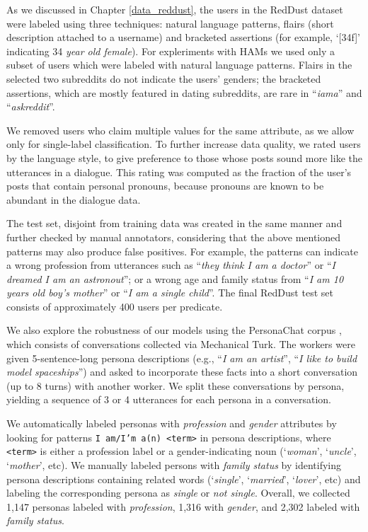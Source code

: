 As we discussed in Chapter \ref{data_reddust}, the users in the RedDust dataset were labeled using three techniques: natural language patterns, flairs (short description attached to a username) and bracketed assertions (for example, `[34f]' indicating 34 \textit{year old female}). For expleriments with HAMs we used only a subset of users which were labeled with natural language patterns. Flairs in the selected two subreddits do not indicate the users' genders; the bracketed assertions, which are mostly featured in dating subreddits, are rare in ``\textit{iama}'' and ``\textit{askreddit}''.

We removed users who claim multiple values for the
same attribute, as we allow only for single-label classification. 
To further increase data quality, we rated users by the language style, to give preference to those whose posts sound more like the utterances in a dialogue. This rating was computed as
the fraction of the user's posts that contain personal pronouns, because pronouns are known to be abundant in the dialogue data.

The test set, disjoint from training data was created in the same manner and further checked by manual annotators, considering that the above mentioned patterns may also produce false positives.
For example, the patterns can indicate a wrong profession from utterances such as ``\textit{they think I am a doctor}'' or ``\textit{I dreamed  I am an astronout}''; or a wrong age and family status
from ``\textit{I am 10 years old boy's mother}'' or
``\textit{I am a single child}''.
The final RedDust test set consists of approximately 400 users per predicate.

 We also explore the robustness of our models using the \gls{PersonaChat corpus} \cite{zhang2018personalizing},
which consists of conversations collected via Mechanical Turk.
The workers were given 5-sentence-long persona descriptions (e.g., ``\textit{I am an artist}'', ``\textit{I like to build model spaceships}'') and asked to incorporate these facts into a short conversation (up to 8 turns) with another worker.
We split these conversations by persona, yielding a sequence of 3 or 4 utterances for each persona in a conversation.

We automatically labeled personas with \textit{profession} and \textit{gender} attributes by looking for patterns \texttt{I am/I'm a(n) <term>} in persona descriptions, where 
\texttt{<term>} is either a profession label
or a gender-indicating noun (`\textit{woman}', `\textit{uncle}', `\textit{mother}', etc).
We manually labeled persons with \textit{family status} by identifying persona
descriptions containing related words (`\textit{single}', `\textit{married}', `\textit{lover}', etc) and labeling the corresponding persona as \textit{single} or \textit{not single}.
Overall, we collected 1,147 personas labeled with \textit{profession}, 1,316 with \textit{gender}, and 2,302 labeled with \textit{family status}.

